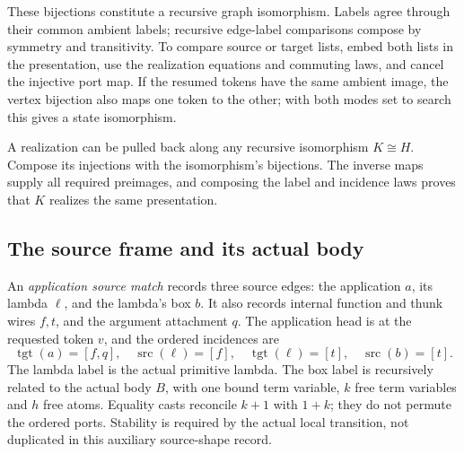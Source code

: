 



These bijections constitute a recursive graph isomorphism. Labels agree
through their common ambient labels; recursive edge-label comparisons compose
by symmetry and transitivity. To compare source or target lists, embed both
lists in the presentation, use the realization equations and commuting laws,
and cancel the injective port map. If the resumed tokens have the same ambient
image, the vertex bijection also maps one token to the other; with both modes
set to search this gives a state isomorphism.



A realization can be pulled back along any recursive isomorphism $K\cong H$.
Compose its injections with the isomorphism's bijections. The inverse maps
supply all required preimages, and composing the label and incidence laws
proves that $K$ realizes the same presentation.


\subsection{The source frame and its actual body}

An \emph{application source match} records three source edges: the application
$a$, its lambda $\ell$, and the lambda's box $b$. It also records internal
function and thunk wires $f,t$, and the argument attachment $q$. The application
head is at the requested token $v$, and the ordered incidences are
\[
\operatorname{tgt}(a)=[f,q],\quad
\operatorname{src}(\ell)=[f],\quad \operatorname{tgt}(\ell)=[t],\quad
\operatorname{src}(b)=[t].
\]
The lambda label is the actual primitive lambda. The box label is recursively
related to the actual body $B$, with one bound term variable, $k$ free term
variables and $h$ free atoms. Equality casts reconcile $k+1$ with $1+k$; they
do not permute the ordered ports. Stability is required by the actual local
transition, not duplicated in this auxiliary source-shape record.

